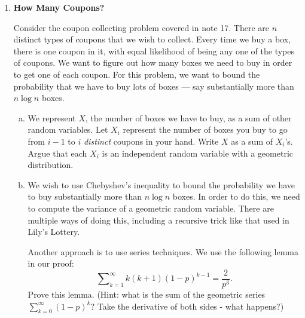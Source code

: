 \documentclass[11pt]{article}
\newif\ifsolutions
\begin{document}
\maketitle



\begin{enumerate}

\item {\bf How Many Coupons?}

Consider the coupon collecting problem covered in note 17. There are
$n$ distinct types of coupons that we wish to collect. Every time we
buy a box, there is one coupon in it, with equal likelihood of being
any one of the types of coupons. We want to figure out how many boxes
we need to buy in order to get one of each coupon. For this problem,
we want to bound the probability that we have to buy lots of boxes
--- say substantially more than $n\log{n}$ boxes. 

\begin{enumerate}[a)]
\item We represent $X$, the number of boxes we have to buy, as a sum
  of other random variables. Let $X_i$ represent the number of boxes
  you buy to go from $i-1$ to $i$ {\em distinct} coupons in your hand. Write
  $X$ as a sum of $X_i$'s. Argue that each $X_i$ is an independent
  random variable with a geometric distribution. 
\vspace{15mm}

\ifsolutions{\color{blue}{
\vspace{-15mm}
\[ X = \sum\nolimits_{i=1}^n X_i \quad\quad\quad \text{Each  } X_i \sim \text{Geo}\left(\frac{n-i+1}{n}\right) \]
}}\fi

\item We wish to use Chebyshev's inequality to bound the probability
  we have to buy substantially more than $n \log{n}$ boxes. In order
  to do this, we need to compute the variance of a geometric random
  variable. There are multiple ways of doing this, including a
  recursive trick like that used in Lily's Lottery.

  Another approach is to use series techniques. We use the following
  lemma in our proof: 
  \[ \sum\nolimits_{k=1}^{\infty} k(k+1)(1-p)^{k-1} =
  \frac{2}{p^3}. \]
 Prove this lemma. (Hint: what is the sum of the
  geometric series $\sum\nolimits_{k=0}^{\infty} (1-p)^k$? Take the
  derivative of both sides - what happens?)

\vspace{40mm}


\end{enumerate}
\end{enumerate}
\end{document}
